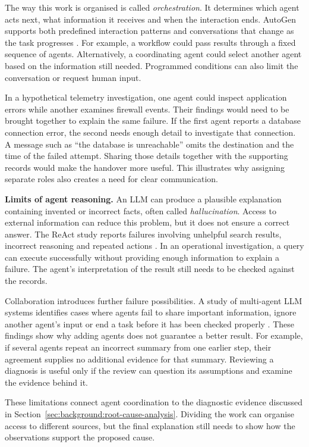 The way this work is organised is called \emph{orchestration}. It
determines which agent acts next, what information it receives and when
the interaction ends. AutoGen supports both predefined interaction
patterns and conversations that change as the task progresses
\parencite{wu2023autogen}. For example, a workflow could pass results
through a fixed sequence of agents. Alternatively, a coordinating agent
could select another agent based on the information still needed.
Programmed conditions can also limit the conversation or request human
input.

In a hypothetical telemetry investigation, one agent could inspect
application errors while another examines firewall events. Their findings
would need to be brought together to explain the same failure. If the
first agent reports a database connection error, the second needs enough
detail to investigate that connection. A message such as \enquote{the
database is unreachable} omits the destination and the time of the failed
attempt. Sharing those details together with the supporting records would
make the handover more useful. This illustrates why assigning separate
roles also creates a need for clear communication.

\noindent\textbf{Limits of agent reasoning.} An LLM can produce a plausible
explanation containing invented or incorrect facts, often called
\emph{hallucination}. Access to external information can reduce this
problem, but it does not ensure a correct answer. The ReAct study reports
failures involving unhelpful search results, incorrect reasoning and
repeated actions \parencite{yao2023react}. In an operational investigation,
a query can execute successfully without providing enough information to
explain a failure. The agent's interpretation of the result still needs
to be checked against the records.

Collaboration introduces further failure possibilities. A study of
multi-agent LLM systems identifies cases where agents fail to share
important information, ignore another agent's input or end a task before
it has been checked properly \parencite{cemri2025mast}. These findings
show why adding agents does not guarantee a better result. For example,
if several agents repeat an incorrect summary from one earlier step,
their agreement supplies no additional evidence for that summary.
Reviewing a diagnosis is useful only if the review can question its
assumptions and examine the evidence behind it.

These limitations connect agent coordination to the diagnostic evidence
discussed in Section~\ref{sec:background:root-cause-analysis}. Dividing the
work can organise access to different sources, but the final explanation
still needs to show how the observations support the proposed cause.


